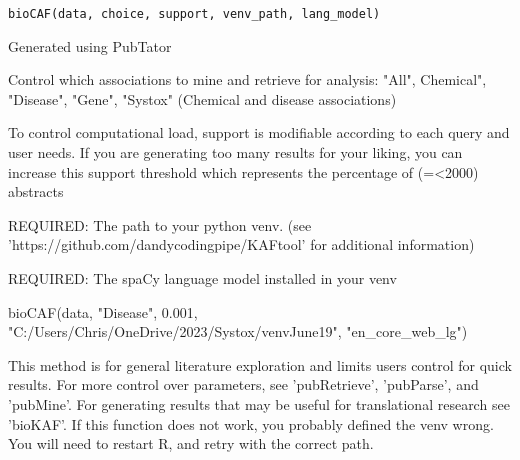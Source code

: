 \documentclass[a4paper]{book}
\begin{document}
%
\begin{Usage}
\begin{verbatim}
bioCAF(data, choice, support, venv_path, lang_model)
\end{verbatim}
\end{Usage}
%
\begin{Arguments}
\begin{ldescription}
\item[\code{data}] Generated using PubTator

\item[\code{choice}] Control which associations to mine and retrieve for analysis: "All", Chemical", "Disease", "Gene", "Systox" (Chemical and disease associations)

\item[\code{support}] To control computational load, support is modifiable according to each query and user needs. If you are generating too many results for your liking, you can increase this support threshold which represents the percentage of (=<2000) abstracts

\item[\code{venv\_path}] REQUIRED: The path to your python venv. (see 'https://github.com/dandycodingpipe/KAFtool' for additional information)

\item[\code{lang\_model}] REQUIRED: The spaCy language model installed in your venv
\end{ldescription}
\end{Arguments}
%
\begin{Examples}
\begin{ExampleCode}
bioCAF(data, "Disease", 0.001, "C:/Users/Chris/OneDrive/2023/Systox/venvJune19", "en_core_web_lg")
\end{ExampleCode}
\end{Examples}
%
\begin{Description}\relax
This method is for general literature exploration and limits users control for quick results. For more control over parameters, see 'pubRetrieve', 'pubParse', and 'pubMine'. For generating results that may be useful for translational research see 'bioKAF'. If this function does not work, you probably defined the venv wrong. You will need to restart R, and retry with the correct path.
\end{Description}
\end{document}
